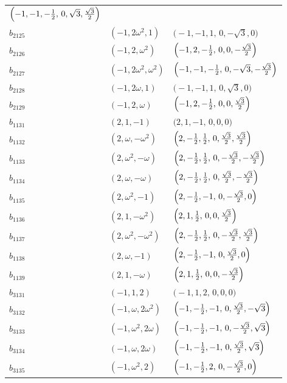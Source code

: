 \documentclass[%
  reprint,
  superscriptaddress,
  amsmath,amssymb,
  pra,
  floatfix,
  longbibliography
]{revtex4-2}
\begin{document}
\begin{longtable}{lll}
$\Bigl(-1,-1,-\tfrac12,\,0,\sqrt{3},\tfrac{\sqrt{3}}{2}\Bigr)$ \\
$b_{2125}$ & $(-1,2\omega^2,1)$ &
$\bigl(-1,-1,1,\,0,-\sqrt{3},0\bigr)$ \\
$b_{2126}$ & $(-1,2,\omega^2)$ &
$\Bigl(-1,2,-\tfrac12,\,0,0,-\tfrac{\sqrt{3}}{2}\Bigr)$ \\
$b_{2127}$ & $(-1,2\omega^2,\omega^2)$ &
$\Bigl(-1,-1,-\tfrac12,\,0,-\sqrt{3},-\tfrac{\sqrt{3}}{2}\Bigr)$ \\
$b_{2128}$ & $(-1,2\omega,1)$ &
$\bigl(-1,-1,1,\,0,\sqrt{3},0\bigr)$ \\
$b_{2129}$ & $(-1,2,\omega)$ &
$\Bigl(-1,2,-\tfrac12,\,0,0,\tfrac{\sqrt{3}}{2}\Bigr)$ \\
$b_{1131}$ & $(2,1,-1)$ &
$\bigl(2,1,-1,\,0,0,0\bigr)$ \\
$b_{1132}$ & $(2,\omega,-\omega^2)$ &
$\Bigl(2,-\tfrac12,\tfrac12,\,0,\tfrac{\sqrt{3}}{2},\tfrac{\sqrt{3}}{2}\Bigr)$ \\
$b_{1133}$ & $(2,\omega^2,-\omega)$ &
$\Bigl(2,-\tfrac12,\tfrac12,\,0,-\tfrac{\sqrt{3}}{2},-\tfrac{\sqrt{3}}{2}\Bigr)$ \\
$b_{1134}$ & $(2,\omega,-\omega)$ &
$\Bigl(2,-\tfrac12,\tfrac12,\,0,\tfrac{\sqrt{3}}{2},-\tfrac{\sqrt{3}}{2}\Bigr)$ \\
$b_{1135}$ & $(2,\omega^2,-1)$ &
$\Bigl(2,-\tfrac12,-1,\,0,-\tfrac{\sqrt{3}}{2},0\Bigr)$ \\
$b_{1136}$ & $(2,1,-\omega^2)$ &
$\Bigl(2,1,\tfrac12,\,0,0,\tfrac{\sqrt{3}}{2}\Bigr)$ \\
$b_{1137}$ & $(2,\omega^2,-\omega^2)$ &
$\Bigl(2,-\tfrac12,\tfrac12,\,0,-\tfrac{\sqrt{3}}{2},\tfrac{\sqrt{3}}{2}\Bigr)$ \\
$b_{1138}$ & $(2,\omega,-1)$ &
$\Bigl(2,-\tfrac12,-1,\,0,\tfrac{\sqrt{3}}{2},0\Bigr)$ \\
$b_{1139}$ & $(2,1,-\omega)$ &
$\Bigl(2,1,\tfrac12,\,0,0,-\tfrac{\sqrt{3}}{2}\Bigr)$ \\
$b_{3131}$ & $(-1,1,2)$ &
$\bigl(-1,1,2,\,0,0,0\bigr)$ \\
$b_{3132}$ & $(-1,\omega,2\omega^2)$ &
$\Bigl(-1,-\tfrac12,-1,\,0,\tfrac{\sqrt{3}}{2},-\sqrt{3}\Bigr)$ \\
$b_{3133}$ & $(-1,\omega^2,2\omega)$ &
$\Bigl(-1,-\tfrac12,-1,\,0,-\tfrac{\sqrt{3}}{2},\sqrt{3}\Bigr)$ \\
$b_{3134}$ & $(-1,\omega,2\omega)$ &
$\Bigl(-1,-\tfrac12,-1,\,0,\tfrac{\sqrt{3}}{2},\sqrt{3}\Bigr)$ \\
$b_{3135}$ & $(-1,\omega^2,2)$ &
$\Bigl(-1,-\tfrac12,2,\,0,-\tfrac{\sqrt{3}}{2},0\Bigr)$ \\

\end{longtable}
\end{document}
